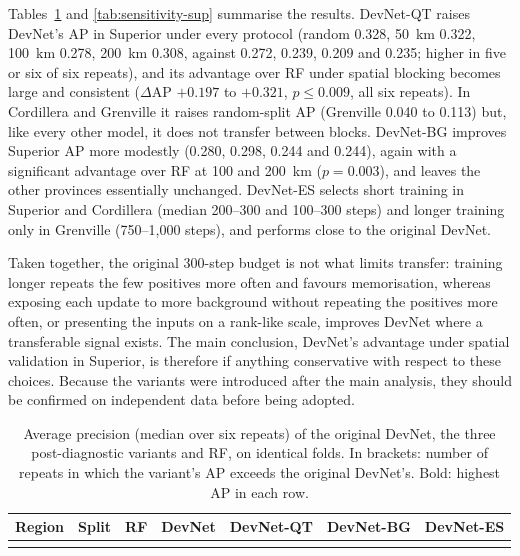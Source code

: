 \documentclass[pdflatex,sn-apa]{sn-jnl}
\begin{document}
\begin{appendices}
Tables~\ref{tab:sensitivity} and \ref{tab:sensitivity-sup} summarise the results. DevNet-QT raises DevNet's AP in Superior under every protocol (random 0.328, 50~km 0.322, 100~km 0.278, 200~km 0.308, against 0.272, 0.239, 0.209 and 0.235; higher in five or six of six repeats), and its advantage over RF under spatial blocking becomes large and consistent ($\Delta$AP $+0.197$ to $+0.321$, $p \leq 0.009$, all six repeats). In Cordillera and Grenville it raises random-split AP (Grenville 0.040 to 0.113) but, like every other model, it does not transfer between blocks. DevNet-BG improves Superior AP more modestly (0.280, 0.298, 0.244 and 0.244), again with a significant advantage over RF at 100 and 200~km ($p = 0.003$), and leaves the other provinces essentially unchanged. DevNet-ES selects short training in Superior and Cordillera (median 200--300 and 100--300 steps) and longer training only in Grenville (750--1,000 steps), and performs close to the original DevNet.

Taken together, the original 300-step budget is not what limits transfer: training longer repeats the few positives more often and favours memorisation, whereas exposing each update to more background without repeating the positives more often, or presenting the inputs on a rank-like scale, improves DevNet where a transferable signal exists. The main conclusion, DevNet's advantage under spatial validation in Superior, is therefore if anything conservative with respect to these choices. Because the variants were introduced after the main analysis, they should be confirmed on independent data before being adopted.

\begin{table}[!h]
\caption{Average precision (median over six repeats) of the original DevNet, the three post-diagnostic variants and RF, on identical folds. In brackets: number of repeats in which the variant's AP exceeds the original DevNet's. Bold: highest AP in each row.}\label{tab:sensitivity}
\scriptsize
\setlength{\tabcolsep}{2.5pt}
\begin{tabular*}{\textwidth}{@{\extracolsep\fill}lllllll}
\toprule
Region & Split & RF & DevNet & DevNet-QT & DevNet-BG & DevNet-ES \\
\midrule
\botrule
\end{tabular*}
\end{table}


\end{appendices}
\end{document}
